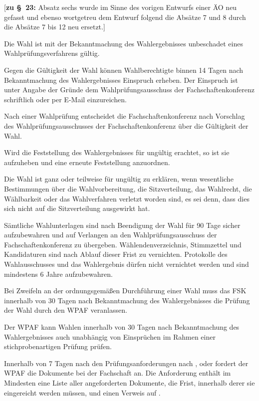 \documentclass[%
draft,%
multilinesections%
]{fswo}
\newcommand\bemFr[1] {{\color{Red}[#1]}}
\newcommand\bemFr[1]{}%
\begin{document}
\bemFr{\textbf{zu \S~23:} Absatz sechs wurde im Sinne des vorigen Entwurfs einer ÄO neu gefasst und ebenso wortgetreu dem Entwurf folgend die Absätze 7 und 8 durch die Absätze 7 bis 12 neu ersetzt.}

\begin{contract}
Die Wahl ist mit der Bekanntmachung des Wahlergebnisses unbeschadet eines Wahlprüfungsverfahrens gültig.

Gegen die Gültigkeit der Wahl können Wahlberechtigte binnen 14 Tagen nach Bekanntmachung des Wahlergebnisses Einspruch erheben.
Der Einspruch ist unter Angabe der Gründe dem Wahlprüfungsausschuss der Fachschaftenkonferenz schriftlich oder per E-Mail einzureichen.
\label{cls-wahlpruefung:abs-pruefung-einspruch}

Nach einer Wahlprüfung entscheidet die Fachschaftenkonferenz nach Vorschlag des Wahlprüfungsausschusses der Fachschaftenkonferenz über die Gültigkeit der Wahl.

Wird die Feststellung des Wahlergebnisses für ungültig erachtet, so ist sie aufzuheben und eine erneute Feststellung anzuordnen.

Die Wahl ist ganz oder teilweise für ungültig zu erklären, wenn wesentliche Bestimmungen über die Wahlvorbereitung, die Sitzverteilung, das Wahlrecht, die Wählbarkeit oder das Wahlverfahren verletzt worden sind, es sei denn, dass dies sich nicht auf die Sitzverteilung ausgewirkt hat.

Sämtliche Wahlunterlagen sind nach Beendigung der Wahl für 90 Tage sicher aufzubewahren und auf Verlangen an den Wahlprüfungsausschuss der Fachschaftenkonferenz zu übergeben.
Wählendenverzeichnis, Stimmzettel und Kandidaturen sind nach Ablauf dieser Frist zu vernichten.
Protokolle des Wahlausschusses und das Wahlergebnis dürfen nicht vernichtet werden und sind mindestens 6 Jahre aufzubewahren.
\label{cls-wahlpruefung:abs-aufbewahrung}

Bei Zweifeln an der ordnungsgemäßen Durchführung einer Wahl muss das FSK innerhalb von 30 Tagen nach Bekanntmachung des Wahlergebnisses die Prüfung der Wahl durch den WPAF veranlassen.
\label{cls-wahlpruefung:abs-pruefung-zweifel}

Der WPAF kann Wahlen innerhalb von 30 Tagen nach Bekanntmachung des Wahlergebnisses auch unabhängig von Einsprüchen im Rahmen einer stichprobenartigen Prüfung prüfen.
\label{cls-wahlpruefung:abs-pruefung-stichprobe}

Innerhalb von 7 Tagen nach den Prüfungsanforderungen nach ,  oder  fordert der WPAF die Dokumente bei der Fachschaft an.
Die Anforderung enthält im Mindesten eine Liste aller angeforderten Dokumente, die Frist, innerhalb derer sie eingereicht werden müssen, und einen Verweis auf
.


\end{contract}
\end{document}
